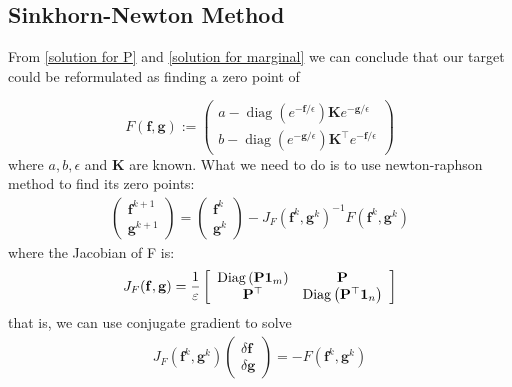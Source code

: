 \documentclass{article}
\begin{document}
\begin{large}
\subsection{Sinkhorn-Newton Method}
From \ref{solution for P} and \ref{solution for marginal} we can conclude that our target could be reformulated as finding a zero point of

\begin{displaymath}
F(\mathbf { f },\mathbf { g}) :=
\left( \begin{array}{c}
a -  \operatorname { diag } (   e ^ { -\mathbf { f }  / \epsilon } ) \mathbf { K }  e ^ { -\mathbf { g }  / \epsilon } \\
b -  \operatorname { diag } (   e ^ { -\mathbf { g }  / \epsilon } ) \mathbf { K }^ { \top }  e ^ { -\mathbf { f }  / \epsilon }
\end{array} \right)
\end{displaymath}
where $a,b,\epsilon$ and $\mathbf { K}$ are known.
What we need to do is to use newton-raphson method to find its zero points:
\begin{align}
\left( \begin{array} { l } { \mathbf { f }^ { k + 1 } } \\ { \mathbf { g } ^ { k + 1 } } \end{array} \right) = \left( \begin{array} { l } { \mathbf { f } ^ { k } } \\ { \mathbf { g } ^ { k } } \end{array} \right) - J _ { F } \left( \mathbf { f } ^ { k } , \mathbf { g } ^ { k } \right) ^ { - 1 } F \left( \mathbf { f } ^ { k } , \mathbf { g } ^ { k } \right)
\end{align}
where the Jacobian of F is:
\begin{align}
J _ { F } ( \mathbf { f }  ,  \mathbf { g } ) = \frac { 1 } { \varepsilon } \left[ \begin{array} { c c } { \operatorname { Diag } \left( \mathbf{P} \mathbf { 1 } _ { m } \right) } & { \mathbf{P} } \\ { \mathbf{P} ^ { \top } } & { \operatorname { Diag } \left( \mathbf{P} ^ { \top } \mathbf { 1 } _ { n } \right) } \end{array} \right]
\end{align}
that is, we can use conjugate gradient to solve
\begin{align}
J _ { F } \left(  \mathbf {f} ^ { k } ,  \mathbf {g} ^ { k } \right) \left( \begin{array} { c } { \delta  \mathbf {f} } \\ { \delta  \mathbf {g} } \end{array} \right) = - F \left(  \mathbf {f} ^ { k } ,  \mathbf {g} ^ { k } \right)

\end{align}
\end{large}
\end{document}
